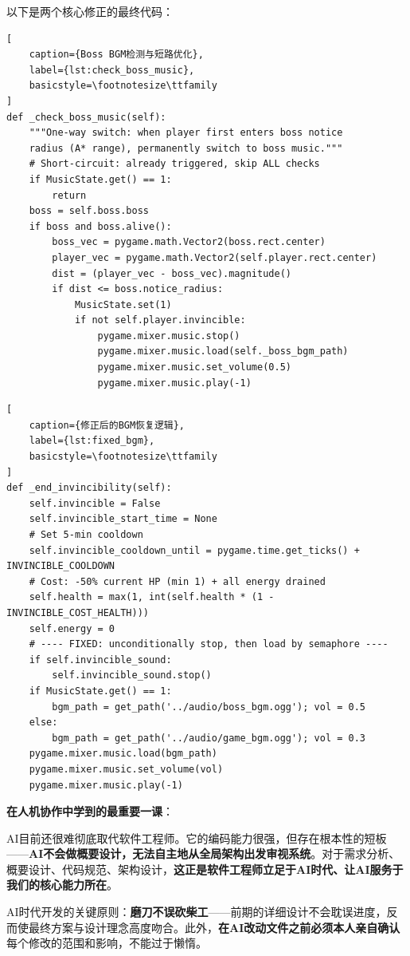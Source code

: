 \documentclass[12pt,a4paper]{ctexart}
\begin{document}
以下是两个核心修正的最终代码：

\begin{lstlisting}[
    caption={Boss BGM检测与短路优化},
    label={lst:check_boss_music},
    basicstyle=\footnotesize\ttfamily
]
def _check_boss_music(self):
    """One-way switch: when player first enters boss notice
    radius (A* range), permanently switch to boss music."""
    # Short-circuit: already triggered, skip ALL checks
    if MusicState.get() == 1:
        return
    boss = self.boss.boss
    if boss and boss.alive():
        boss_vec = pygame.math.Vector2(boss.rect.center)
        player_vec = pygame.math.Vector2(self.player.rect.center)
        dist = (player_vec - boss_vec).magnitude()
        if dist <= boss.notice_radius:
            MusicState.set(1)
            if not self.player.invincible:
                pygame.mixer.music.stop()
                pygame.mixer.music.load(self._boss_bgm_path)
                pygame.mixer.music.set_volume(0.5)
                pygame.mixer.music.play(-1)
\end{lstlisting}

\begin{lstlisting}[
    caption={修正后的BGM恢复逻辑},
    label={lst:fixed_bgm},
    basicstyle=\footnotesize\ttfamily
]
def _end_invincibility(self):
    self.invincible = False
    self.invincible_start_time = None
    # Set 5-min cooldown
    self.invincible_cooldown_until = pygame.time.get_ticks() + INVINCIBLE_COOLDOWN
    # Cost: -50% current HP (min 1) + all energy drained
    self.health = max(1, int(self.health * (1 - INVINCIBLE_COST_HEALTH)))
    self.energy = 0
    # ---- FIXED: unconditionally stop, then load by semaphore ----
    if self.invincible_sound:
        self.invincible_sound.stop()
    if MusicState.get() == 1:
        bgm_path = get_path('../audio/boss_bgm.ogg'); vol = 0.5
    else:
        bgm_path = get_path('../audio/game_bgm.ogg'); vol = 0.3
    pygame.mixer.music.load(bgm_path)
    pygame.mixer.music.set_volume(vol)
    pygame.mixer.music.play(-1)
\end{lstlisting}

\textbf{在人机协作中学到的最重要一课}：

AI目前还很难彻底取代软件工程师。它的编码能力很强，但存在根本性的短板——\textbf{AI不会做概要设计，无法自主地从全局架构出发审视系统}。对于需求分析、概要设计、代码规范、架构设计，\textbf{这正是软件工程师立足于AI时代、让AI服务于我们的核心能力所在}。

AI时代开发的关键原则：\textbf{磨刀不误砍柴工}——前期的详细设计不会耽误进度，反而使最终方案与设计理念高度吻合。此外，\textbf{在AI改动文件之前必须本人亲自确认}每个修改的范围和影响，不能过于懒惰。
\end{document}
